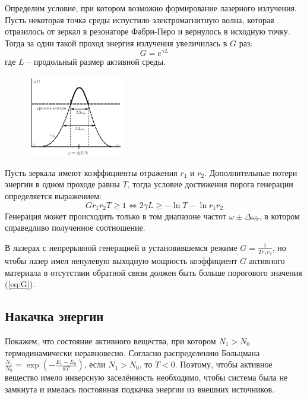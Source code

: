 Определим условие, при котором возможно формирование лазерного излучения. Пусть 
некоторая точка среды испустило электромагнитную волна, которая отразилось от 
зеркал в резонаторе Фабри-Перо и вернулось в исходную точку. Тогда за один 
такой проход энергия излучения увеличилась в $G$ раз:
$$
G = e^{\gamma L}
$$
где $L$ -- продольный размер активной среды.

\begin{figure}
	\centering
	\includegraphics[width=0.38\textwidth]{../Изображения/Порог генерации.png}
\end{figure}

Пусть зеркала имеют коэффициенты отражения $r_1$ и $r_2$. Дополнительные потери 
энергии в одном проходе равны $T$, тогда условие достижения порога генерации 
определяется выражением:
\begin{equation}
	G r_1 r_2 T \ge 1 \Leftrightarrow 2 \gamma L \ge - \ln T - \ln r_1 r_2
	\label{eq:G}
\end{equation}
Генерация может происходить только в том диапазоне частот $\omega \pm \Delta 
\omega_г$, в котором справедливо полученное соотношение.

В лазерах с непрерывной генерацией в установившемся режиме $G = \frac{1}{T r_1 
r_2}$, но чтобы лазер имел ненулевую выходную мощность коэффициент $G$ 
активного материала в отсутствии обратной связи должен быть больше порогового 
значения (\ref{eq:G}).

\subsection*{Накачка энергии}

Покажем, что состояние активного вещества, при котором $N_1 > N_0$ 
термодинамически неравновесно. Согласно распределению Больцмана 
$\frac{N_1}{N_0} = \exp \left(- \frac{E_1 - E_0}{k T}\right)$, если $N_1 > 
N_0$, то $T < 0$. Поэтому, чтобы активное вещество имело инверсную заселённость 
необходимо, чтобы система была не замкнута и имелась постоянная подкачка 
энергии из внешних источников.

